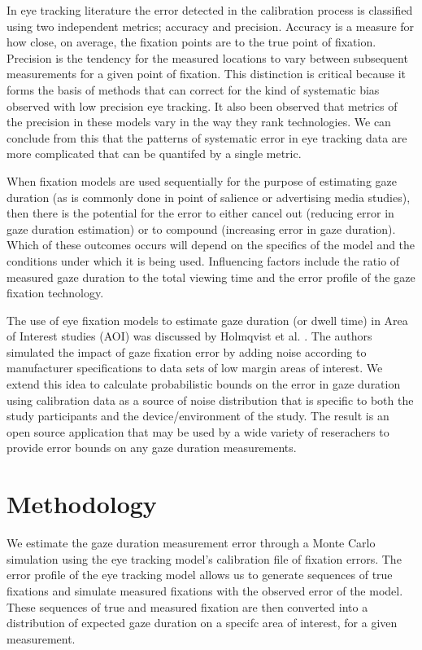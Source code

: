 \documentclass[12pt,a4paper]{article}
\numberwithin{equation}{section}
\begin{document}
In eye tracking literature the error detected in the calibration process is classified
using two independent metrics; accuracy and precision. Accuracy is a measure for how
close, on average, the fixation points are to the true point of fixation.
Precision is the tendency for the measured locations to vary between subsequent measurements
for a given point of fixation\cite{Holmqvist2022}. This distinction
is critical because it forms the basis of methods that can correct for the kind of 
systematic bias observed with low precision eye tracking. It also been observed that
metrics of the precision in these models vary in the way they rank 
technologies\cite{Niehorster2020}. We can conclude from this that the patterns of 
systematic error in eye tracking
data are more complicated that can be quantifed by a single metric.

When fixation models are used sequentially for the purpose of estimating gaze duration
(as is commonly done in point of salience or advertising media studies), 
then there is the potential for the error
to either cancel out (reducing error in gaze duration estimation) or to compound
(increasing error in gaze duration). Which of these outcomes occurs will depend on the
specifics of the model and the conditions under which it is being used.
Influencing factors include the ratio of measured gaze duration to the 
total viewing time and the error profile of the gaze fixation technology.

The use of eye fixation models to estimate gaze duration (or dwell time) in Area of
Interest studies (AOI) was discussed by Holmqvist et al. \cite{Holmqvist2012}. The
authors simulated the impact of gaze fixation error by adding noise according to
manufacturer specifications to data sets of low margin areas of interest. We extend 
this idea to calculate probabilistic bounds on the error in gaze duration using
calibration data as a source of noise distribution that is specific to both the
study participants and the device/environment of the study. The result is an open
source application that may be used by a wide variety of reserachers to provide
error bounds on any gaze duration measurements.

\section{Methodology}

We estimate the gaze duration measurement error through a Monte Carlo simulation
using the eye tracking model's calibration file of fixation errors.
The error profile of the eye tracking model allows us to generate sequences of true
fixations and simulate measured fixations with the observed error of the model.
These sequences of true and measured fixation are then converted into a distribution
of expected gaze duration on a specifc area of interest, for a given measurement. 
\end{document}
